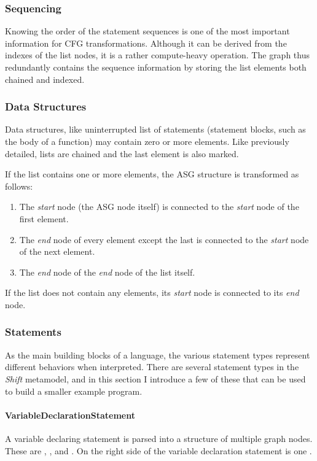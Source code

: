 \subsubsection{Sequencing}
Knowing the order of the statement sequences is one of the most important information for CFG transformations. Although it can be derived from the indexes of the list nodes, it is a rather compute-heavy operation. The graph thus redundantly contains the sequence information by storing the list elements both chained and indexed.

\subsubsection{Data Structures}
Data structures, like uninterrupted list of statements (statement blocks, such as the body of a function) may contain zero or more elements. Like previously detailed, lists are chained and the last element is also marked.

If the list contains one or more elements, the ASG structure is transformed as follows:
\begin{enumerate}[topsep=0pt]
	\item The \emph{start} node (the ASG node itself) is connected to the \emph{start} node of the first element.
	\item The \emph{end} node of every element except the last is connected to the \emph{start} node of the next element.
	\item The \emph{end} node of the \emph{end} node of the list itself.
\end{enumerate}


If the list does not contain any elements, its \emph{start} node is connected to its \emph{end} node.

\subsubsection{Statements}
As the main building blocks of a language, the various statement types represent different behaviors when interpreted. There are several statement types in the \emph{Shift} metamodel, and in this section I introduce a few of these that can be used to build a smaller example program.

\paragraph{VariableDeclarationStatement}
A variable declaring statement is parsed into a structure of multiple graph nodes. These are , , and . On the right side of the variable declaration statement is one .

